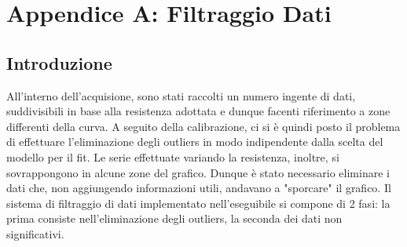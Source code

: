 \documentclass{article}[a4paper, oneside, 11pt]
\begin{document}
\section{Appendice A: Filtraggio Dati}\label{app: A}

\subsection{Introduzione}
All'interno dell'acquisione, sono stati raccolti un numero ingente di dati,
suddivisibili in base alla resistenza adottata e dunque facenti riferimento
a zone differenti della curva. A seguito della calibrazione, ci si è quindi
posto il problema di effettuare l'eliminazione degli outliers in modo
indipendente dalla scelta del modello per il fit. Le serie effettuate
variando la resistenza, inoltre, si sovrappongono in alcune zone del
grafico. Dunque è stato necessario eliminare i dati che, non aggiungendo
informazioni utili, andavano a "sporcare" il grafico.
Il sistema di filtraggio di dati implementato
nell'eseguibile si compone di 2 fasi: la prima consiste nell’eliminazione degli
outliers, la seconda dei dati non significativi.
\end{document}
